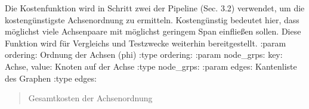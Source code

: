 \documentclass[a4paper,10pt,ngerman]{sphinxmanual}
\begin{document}
\begin{fulllineitems}
\label{\detokenize{api:src.cost.cost_function_whole}}
\pysigstartsignatures
\pysiglinewithargsret
{}
{\sphinxparamcomma {}\sphinxparamcomma {}}
{}
\pysigstopsignatures
\sphinxAtStartPar
Die Kostenfunktion wird in Schritt zwei der Pipeline (Sec. 3.2) verwendet, um die kostengünstigste Achsenordnung zu ermitteln.
Kostengünstig bedeutet hier, dass möglichst viele Achsenpaare mit möglichst geringem Span einfließen sollen.
Diese Funktion wird für Vergleichs\sphinxhyphen{} und Testzwecke weiterhin bereitgestellt.
:param ordering: Ordnung der Achsen (phi)
:type ordering: 
:param node\_grps: key: Achse, value: Knoten auf der Achse
:type node\_grps: 
:param edges: Kantenliste des Graphen
:type edges: 
\begin{quote}\begin{description}
\sphinxAtStartPar
Gesamtkosten der Achsenordnung

\sphinxAtStartPar
{}

\end{description}\end{quote}

\end{fulllineitems}

\end{document}
